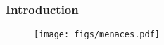 

\begin{frame}

  \frametitle{Introduction}

  \begin{figure}
    \centering
    \texttt{[image: figs/menaces.pdf]}
  \end{figure}



\end{frame}
